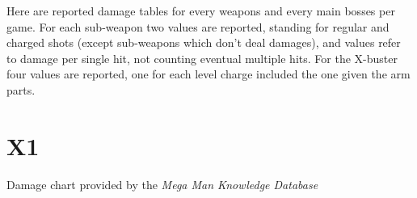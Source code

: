 Here are reported damage tables for every weapons and every main bosses per game. For each sub-weapon two values are reported, standing for regular and charged shots (except sub-weapons which don't deal damages), and values refer to damage per single hit, not counting eventual multiple hits. For the X-buster four values are reported, one for each level charge included the one given the arm parts.
\section{X1}
Damage chart provided by the \emph{Mega Man Knowledge Database}~\cite{wiki:damage_chart_X1}

\begin{table}[htp]
\end{table}

